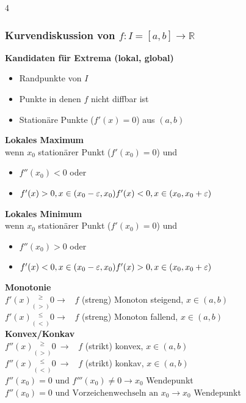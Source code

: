\documentclass[6pt,a4paper]{scrartcl}
\begin{document}
\begin{multicols*}{4}
    \subsubsection{Kurvendiskussion von $f: I = [a, b] \rightarrow \mathbb{R}$}
    \textbf{Kandidaten für Extrema (lokal, global)}
    \begin{itemize}\itemsep0pt
        \item Randpunkte von $I$
        \item Punkte in denen $f$ nicht diffbar ist
        \item Stationäre Punkte ($f'(x)=0$) aus $(a,b)$
    \end{itemize}
    \textbf{Lokales Maximum} \\
    wenn $x_0$ stationärer Punkt ($f'(x_0) = 0$) und
    \begin{itemize}\itemsep0pt
        \item
              $f''(x_0)<0$ oder
        \item
              $f'(x) > 0, x \in (x_0-\varepsilon, x_0) \\
                  f'(x) < 0, x \in (x_0, x_0+\varepsilon)$
    \end{itemize}
    \textbf{Lokales Minimum} \\
    wenn $x_0$ stationärer Punkt ($f'(x_0) = 0$) und
    \begin{itemize}\itemsep0pt
        \item
              $f''(x_0)>0$ oder
        \item
              $f'(x) < 0, x \in (x_0-\varepsilon, x_0) \\
                  f'(x) > 0, x \in (x_0, x_0+\varepsilon)$
    \end{itemize}
    \textbf{Monotonie} \\
    $f'(x) \underset{(>)}{^{\ge}} 0 \rightarrow$ \ $f$ (streng) Monoton steigend, $x\in(a,b)$\\
    $f'(x) \underset{(<)}{^{\le}} 0 \rightarrow$ \ $f$ (streng) Monoton fallend, $x\in(a,b)$\\
    \textbf{Konvex/Konkav} \\
    $f''(x) \underset{(>)}{^{\ge}} 0 \ \rightarrow$ \ $f$ (strikt) konvex, $x\in(a,b)$\\
    $f''(x) \underset{(<)}{^{\le}} 0 \ \rightarrow$ \ $f$ (strikt) konkav, $x\in(a,b)$\\
    $f''(x_0)=0 \text{ und } f'''(x_0) \ne 0 \rightarrow x_0$ Wendepunkt \\
    $f''(x_0)=0 \text{ und Vorzeichenwechseln an } x_0 \rightarrow x_0$ Wendepunkt \\

\end{multicols*}
\end{document}
